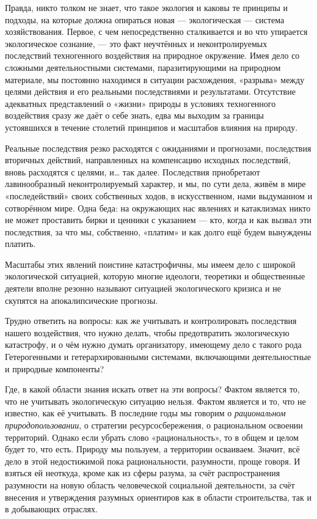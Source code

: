\documentclass[11pt,a4paper]{article}
\begin{document}
Правда, никто толком не знает, что такое экология и каковы те принципы и
подходы, на которые должна опираться новая — экологическая — система
хозяйствования. Первое, с чем непосредственно сталкивается и во что упирается
экологическое сознание, — это факт неучтённых и неконтролируемых последствий
техногенного воздействия на природное окружение. Имея дело со сложными
деятельностными системами, паразитирующими на природном материале, мы
постоянно находимся в ситуации расхождения, «разрыва» между целями действия и
его реальными последствиями и результатами. Отсутствие адекватных
представлений о «жизни» природы в условиях техногенного воздействия сразу же
даёт о себе знать, едва мы выходим за границы устоявшихся в течение столетий
принципов и масштабов влияния на природу. 

Реальные последствия резко расходятся с ожиданиями и прогнозами, последствия
вторичных действий, направленных на компенсацию исходных последствий, вновь
расходятся с целями, и… так далее. Последствия приобретают лавинообразный
неконтролируемый характер, и мы, по сути дела, живём в мире «последействий»
своих собственных ходов, в искусственном, нами выдуманном и сотворённом
мире. Одна беда: на окружающих нас явлениях и катаклизмах никто не может
проставить бирки и ценники с указанием — кто, когда и как вызвал эти
последствия, за что мы, собственно, «платим» и как долго ещё будем вынуждены
платить. 

Масштабы этих явлений поистине катастрофичны, мы имеем дело с широкой
экологической ситуацией, которую многие идеологи, теоретики и общественные
деятели вполне резонно называют ситуацией экологического кризиса и не скупятся
на апокалипсические прогнозы. 

Трудно ответить на вопросы: как же учитывать и контролировать последствия
нашего воздействия, что нужно делать, чтобы предотвратить экологическую
катастрофу, и о чём нужно думать организатору, имеющему дело с такого рода
Гетерогенными и гетерархированными системами, включающими деятельностные и
природные компоненты? 

Где, в какой области знания искать ответ на эти вопросы? Фактом является то,
что не учитывать экологическую ситуацию нельзя. Фактом является и то, что не
известно, как её учитывать. В последние годы мы говорим о \emph{рациональном
  природопользовании}, о стратегии ресурсосбережения, о рациональном освоении
территорий. Однако если убрать слово «рациональность», то в общем и целом
будет то, что есть. Природу мы пользуем, а территории осваиваем. Значит, всё
дело в этой недостижимой пока рациональности, разумности, проще говоря. И
взяться ей неоткуда, кроме как из сферы разума, за счёт распространения
разумности на новую область человеческой социальной деятельности, за счёт
внесения и утверждения разумных ориентиров как в области строительства, так и
в добывающих отраслях.
\end{document}
